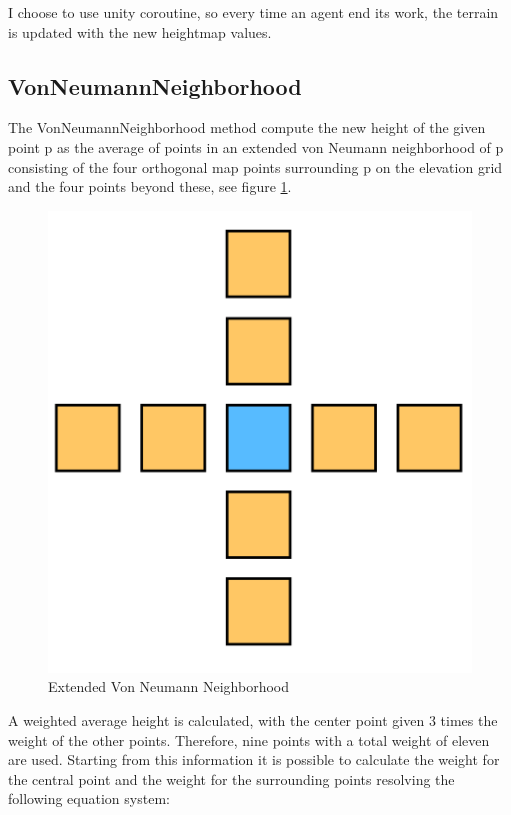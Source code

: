 \documentclass[12pt]{article}
\begin{document}
    I choose to use unity coroutine, so every time an agent end its work, the terrain is updated with the new heightmap values.

    \subsection{VonNeumannNeighborhood} \label{section:Von Neumann}
    The VonNeumannNeighborhood method compute the new height of the given point p as the average of points in an extended von Neumann neighborhood of p consisting of the
    four orthogonal map points surrounding p on the elevation grid and the four points beyond these, see figure \ref{fig:vonNeumann}.

    \begin{figure}
        \centering
        \includegraphics[scale = 0.7]{images/Extended VonNeumannNeighborhood.png}
        \caption{Extended Von Neumann Neighborhood}
        \label{fig:vonNeumann}
    \end{figure}

    \noindent
    A weighted average height is calculated, with the center point given 3 times the weight of the other points. Therefore, nine points with a total weight of eleven are used.
    Starting from this information it is possible to calculate the weight for the central point and the weight for the surrounding points resolving the following equation system:
\end{document}
